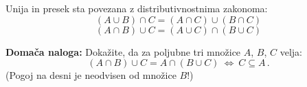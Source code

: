 \documentclass[12pt,a4paper]{article}
\def\ali {{~\vee~}}
\def\inn {{~\wedge~}}
\def\sledi {{~\Rightarrow~}}
\def\cee {{~\Leftrightarrow~}}
\begin{document}
\bigskip
Unija in presek sta povezana z distributivnostnima zakonoma:
$$(A\cup B)\cap C = (A\cap C)\cup (B\cap C)$$
$$(A\cap B)\cup C = (A\cup C)\cap (B\cup C)$$

%
%
%
%


\medskip
{\bf Domača naloga:} Dokažite, da za poljubne tri množice $A$, $B$, $C$ velja:
$$(A\cap B)\cup C = A\cap (B\cup C) \cee C\subseteq A\,.$$
(Pogoj na desni je neodvisen od množice $B$!)

%
%
%
%
%
%
\bigskip
\end{document}
